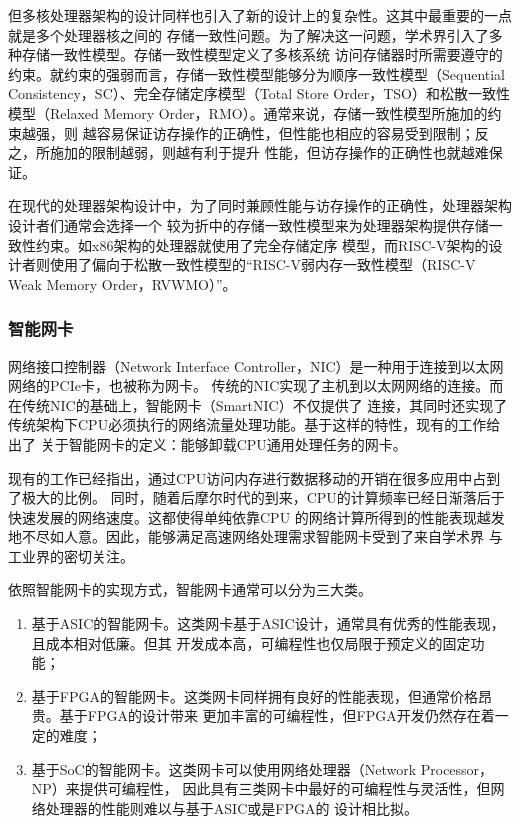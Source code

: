 但多核处理器架构的设计同样也引入了新的设计上的复杂性。这其中最重要的一点就是多个处理器核之间的
存储一致性问题。为了解决这一问题，学术界引入了多种存储一致性模型。存储一致性模型定义了多核系统
访问存储器时所需要遵守的约束。就约束的强弱而言，存储一致性模型能够分为顺序一致性模型（Sequential
Consistency，SC）、完全存储定序模型（Total Store Order，TSO）和松散一致性模型（Relaxed
Memory Order，RMO）\cite{sorin2011primer}。通常来说，存储一致性模型所施加的约束越强，则
越容易保证访存操作的正确性，但性能也相应的容易受到限制；反之，所施加的限制越弱，则越有利于提升
性能，但访存操作的正确性也就越难保证。

在现代的处理器架构设计中，为了同时兼顾性能与访存操作的正确性，处理器架构设计者们通常会选择一个
较为折中的存储一致性模型来为处理器架构提供存储一致性约束。如x86架构的处理器就使用了完全存储定序
模型，而RISC-V架构的设计者则使用了偏向于松散一致性模型的“RISC-V弱内存一致性模型（RISC-V Weak
Memory Order，RVWMO）”\cite{waterman2016design}。

\subsubsection{智能网卡}
\label{section:background_smartnic}

网络接口控制器（Network Interface Controller，NIC）是一种用于连接到以太网网络的PCIe卡，也被称为网卡。
传统的NIC实现了主机到以太网网络的连接。而在传统NIC的基础上，智能网卡（SmartNIC）不仅提供了
连接，其同时还实现了传统架构下CPU必须执行的网络流量处理功能。基于这样的特性，现有的工作给出了
关于智能网卡的定义：能够卸载CPU通用处理任务的网卡\cite{pcmag_smartnic,maxiaoxiao2022survey}。

现有的工作已经指出，通过CPU访问内存进行数据移动的开销在很多应用中占到了极大的比例\cite{maxiaoxiao2022survey}。
同时，随着后摩尔时代的到来，CPU的计算频率已经日渐落后于快速发展的网络速度。这都使得单纯依靠CPU
的网络计算所得到的性能表现越发地不尽如人意。因此，能够满足高速网络处理需求智能网卡受到了来自学术界
与工业界的密切关注。

依照智能网卡的实现方式，智能网卡通常可以分为三大类\cite{bhalgat2021smartnic}。

\begin{enumerate}
  \item 基于ASIC的智能网卡。这类网卡基于ASIC设计，通常具有优秀的性能表现，且成本相对低廉。但其
        开发成本高，可编程性也仅局限于预定义的固定功能；
  \item 基于FPGA的智能网卡。这类网卡同样拥有良好的性能表现，但通常价格昂贵。基于FPGA的设计带来
        更加丰富的可编程性，但FPGA开发仍然存在着一定的难度；
  \item 基于SoC的智能网卡。这类网卡可以使用网络处理器（Network Processor，NP）来提供可编程性，
        因此具有三类网卡中最好的可编程性与灵活性，但网络处理器的性能则难以与基于ASIC或是FPGA的
        设计相比拟。
\end{enumerate}

